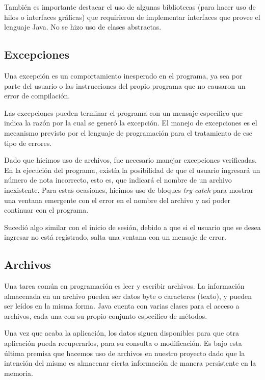 \documentclass[12pt]{article}
\begin{document}
\par También es importante destacar el uso de algunas bibliotecas (para hacer uso de hilos o interfaces gráficas) que requirieron de implementar interfaces que provee el lenguaje Java. No se hizo uso de clases abstractas.

\subsection{Excepciones}
Una excepción es un comportamiento inesperado en el programa, ya sea por parte del usuario o las instrucciones del propio programa que no causaron un error de compilación.

\par Las excepciones pueden terminar el programa con un mensaje específico que indica la razón por la cual se generó la excepción. El manejo de excepciones es el mecanismo previsto por el lenguaje de programación para el tratamiento de ese tipo de errores.

\par Dado que hicimos uso de archivos, fue necesario manejar excepciones verificadas. En la ejecución del programa, existía la posibilidad de que el usuario ingresará un número de nota incorrecto, esto es, que indicará el nombre de un archivo inexistente. Para estas ocasiones, hicimos uso de bloques \textit{try-catch} para mostrar una ventana emergente con el error en el nombre del archivo y así poder continuar con el programa.

\par Sucedió algo similar con el inicio de sesión, debido a que si el usuario que se desea ingresar no está registrado, salta una ventana con un mensaje de error.

\subsection{Archivos}
Una tarea común en programación es leer y escribir archivos. La información almacenada en un archivo pueden ser datos byte o caracteres (texto), y pueden ser leídos en la misma forma. Java cuenta con varias clases para el acceso a archivos, cada una con su propio conjunto específico de métodos.

\par Una vez que acaba la aplicación, los datos siguen disponibles para que otra aplicación pueda recuperarlos, para su consulta o modificación. Es bajo esta última premisa que hacemos uso de archivos en nuestro proyecto dado que la intención del mismo es almacenar cierta información de manera persistente en la memoria.
\end{document}
